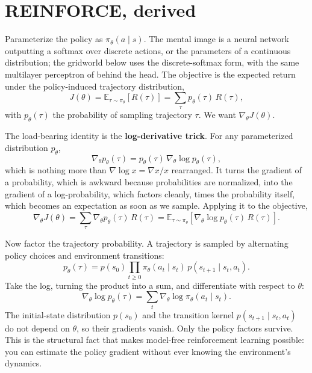 \section{REINFORCE, derived}\label{sec:reinforce}

Parameterize the policy as $\pi_\theta(a \mid s)$. The mental image is a
neural network outputting a softmax over discrete actions, or the parameters
of a continuous distribution; the gridworld below uses the discrete-softmax
form, with the same multilayer perceptron of  behind the
head. The objective is the expected return under the policy-induced trajectory
distribution,
\[
  J(\theta) = \mathbb{E}_{\tau \sim \pi_\theta}[R(\tau)]
            = \sum_\tau p_\theta(\tau)\, R(\tau),
\]
with $p_\theta(\tau)$ the probability of sampling trajectory $\tau$. We want
$\nabla_\theta J(\theta)$.

The load-bearing identity is the \textbf{log-derivative trick}. For any
parameterized distribution $p_\theta$,
\[
  \nabla_\theta p_\theta(\tau) = p_\theta(\tau)\,
      \nabla_\theta \log p_\theta(\tau),
\]
which is nothing more than $\nabla \log x = \nabla x / x$ rearranged. It turns
the gradient of a probability, which is awkward because probabilities are
normalized, into the gradient of a log-probability, which factors cleanly,
times the probability itself, which becomes an expectation as soon as we
sample. Applying it to the objective,
\[
  \nabla_\theta J(\theta)
    = \sum_\tau \nabla_\theta p_\theta(\tau)\, R(\tau)
    = \mathbb{E}_{\tau \sim \pi_\theta}\!\left[
          \nabla_\theta \log p_\theta(\tau)\, R(\tau)
      \right].
\]

Now factor the trajectory probability. A trajectory is sampled by alternating
policy choices and environment transitions:
\[
  p_\theta(\tau) = p(s_0) \prod_{t \ge 0}
      \pi_\theta(a_t \mid s_t)\, p(s_{t+1} \mid s_t, a_t).
\]
Take the log, turning the product into a sum, and differentiate with respect
to $\theta$:
\[
  \nabla_\theta \log p_\theta(\tau)
    = \sum_t \nabla_\theta \log \pi_\theta(a_t \mid s_t).
\]
The initial-state distribution $p(s_0)$ and the transition kernel $p(s_{t+1}
\mid s_t, a_t)$ do not depend on $\theta$, so their gradients vanish. Only the
policy factors survive. This is the structural fact that makes model-free
reinforcement learning possible: you can estimate the policy gradient without
ever knowing the environment's dynamics.

